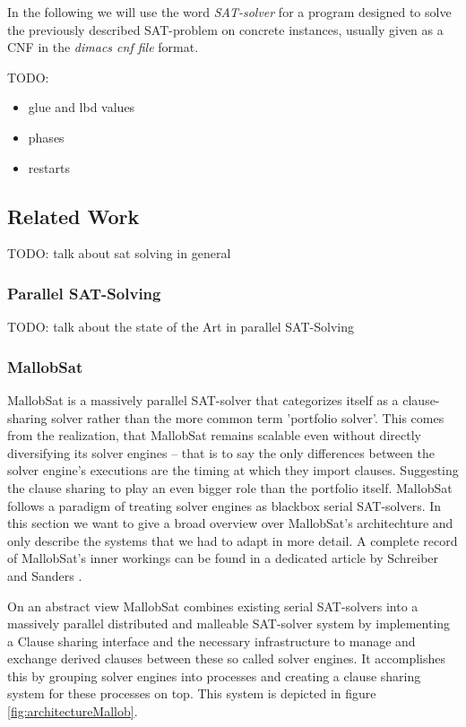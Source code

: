 \documentclass[12pt,a4paper,twoside]{scrartcl}
\numberwithin{equation}{section}
\begin{document}
In the following we will use the word \textit{SAT-solver} for a program designed to solve the previously described SAT-problem on concrete instances, usually given as a CNF in the \textit{dimacs cnf file} format.

TODO:
\begin{itemize}
  \item glue and lbd values
  \item phases
  \item restarts
\end{itemize}

\subsection{Related Work}
\label{sec:relatedWork}

TODO: talk about sat solving in general

\subsubsection{Parallel SAT-Solving}

TODO: talk about the state of the Art in parallel SAT-Solving

\subsubsection{MallobSat}

MallobSat \cite{mallobSat} is a massively parallel SAT-solver that categorizes itself as a clause-sharing solver rather than the more common term 'portfolio solver'. This comes from the realization, that MallobSat remains scalable even without directly diversifying its solver engines -- that is to say the only differences between the solver engine's executions are the timing at which they import clauses. Suggesting the clause sharing to play an even bigger role than the portfolio itself. MallobSat follows a paradigm of treating solver engines as blackbox serial SAT-solvers. In this section we want to give a broad overview over MallobSat's architechture and only describe the systems that we had to adapt in more detail. A complete record of MallobSat's inner workings can be found in a dedicated article by Schreiber and Sanders \cite{mallobSat}.

On an abstract view MallobSat combines existing serial SAT-solvers into a massively parallel distributed and malleable SAT-solver system by implementing a Clause sharing interface and the necessary infrastructure to manage and exchange derived clauses between these so called solver engines. It accomplishes this by grouping solver engines into processes and creating a clause sharing system for these processes on top. This system is depicted in figure \ref{fig:architectureMallob}.
\end{document}
